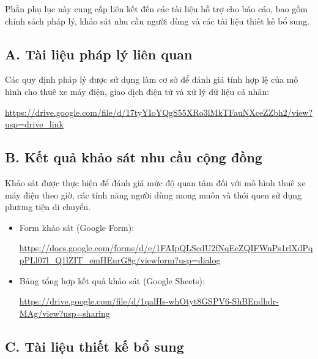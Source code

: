 
Phần phụ lục này cung cấp liên kết đến các tài liệu hỗ trợ cho báo cáo, bao gồm chính sách pháp lý, khảo sát nhu cầu người dùng và các tài liệu thiết kế bổ sung.

\subsection*{A. Tài liệu pháp lý liên quan}

Các quy định pháp lý được sử dụng làm cơ sở để đánh giá tính hợp lệ của mô hình cho thuê xe máy điện, giao dịch điện tử và xử lý dữ liệu cá nhân:

\url{https://drive.google.com/file/d/17tyYIoYQgS55XRo3lMkTFauNXceZZbh2/view?usp=drive_link}

\vspace{10pt}

\subsection*{B. Kết quả khảo sát nhu cầu cộng đồng}

Khảo sát được thực hiện để đánh giá mức độ quan tâm đối với mô hình thuê xe máy điện theo giờ, các tính năng người dùng mong muốn và thói quen sử dụng phương tiện di chuyển.

\begin{itemize}
    \item Form khảo sát (Google Form):
    
    \url{https://docs.google.com/forms/d/e/1FAIpQLScdU2fNqEeZQIFWnPs1rlXdPqpPLl07l_Q1lZIT_emHEnrG8g/viewform?usp=dialog}

    \item Bảng tổng hợp kết quả khảo sát (Google Sheets):  
    
    \url{https://drive.google.com/file/d/1qalHs-whOtyt8GSPV6-ShBEndhdr-MAg/view?usp=sharing}
\end{itemize}

\vspace{10pt}

\subsection*{C. Tài liệu thiết kế bổ sung}

